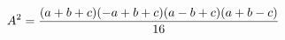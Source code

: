 \documentclass[preview]{standalone}
\begin{document}
\begin{align*}
\special{dvisvgm:raw <g id='unique000'>}A^2 = \frac{(a+b+c)(-a+b+c)(a-b+c)(a+b-c)}{16}\special{dvisvgm:raw </g>}
\end{align*}
\end{document}
